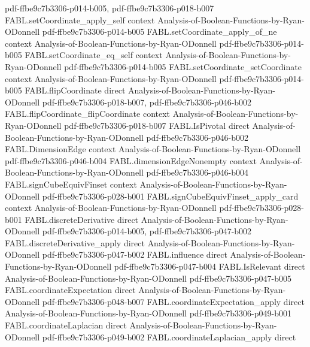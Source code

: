 \begin{theorem}
  {pdf-ffbe9c7b3306-p014-b005,
    pdf-ffbe9c7b3306-p018-b007}
\proofstep
  {FABL.setCoordinate_apply_self}
  {context}
  {Analysis-of-Boolean-Functions-by-Ryan-ODonnell}
  {pdf-ffbe9c7b3306-p014-b005}
\proofstep
  {FABL.setCoordinate_apply_of_ne}
  {context}
  {Analysis-of-Boolean-Functions-by-Ryan-ODonnell}
  {pdf-ffbe9c7b3306-p014-b005}
\proofstep
  {FABL.setCoordinate_eq_self}
  {context}
  {Analysis-of-Boolean-Functions-by-Ryan-ODonnell}
  {pdf-ffbe9c7b3306-p014-b005}
\proofstep
  {FABL.setCoordinate_setCoordinate}
  {context}
  {Analysis-of-Boolean-Functions-by-Ryan-ODonnell}
  {pdf-ffbe9c7b3306-p014-b005}
\proofstep
  {FABL.flipCoordinate}
  {direct}
  {Analysis-of-Boolean-Functions-by-Ryan-ODonnell}
  {pdf-ffbe9c7b3306-p018-b007,
    pdf-ffbe9c7b3306-p046-b002}
\proofstep
  {FABL.flipCoordinate_flipCoordinate}
  {context}
  {Analysis-of-Boolean-Functions-by-Ryan-ODonnell}
  {pdf-ffbe9c7b3306-p018-b007}
\proofstep
  {FABL.IsPivotal}
  {direct}
  {Analysis-of-Boolean-Functions-by-Ryan-ODonnell}
  {pdf-ffbe9c7b3306-p046-b002}
\proofstep
  {FABL.DimensionEdge}
  {context}
  {Analysis-of-Boolean-Functions-by-Ryan-ODonnell}
  {pdf-ffbe9c7b3306-p046-b004}
\proofstep
  {FABL.dimensionEdgeNonempty}
  {context}
  {Analysis-of-Boolean-Functions-by-Ryan-ODonnell}
  {pdf-ffbe9c7b3306-p046-b004}
\proofstep
  {FABL.signCubeEquivFinset}
  {context}
  {Analysis-of-Boolean-Functions-by-Ryan-ODonnell}
  {pdf-ffbe9c7b3306-p028-b001}
\proofstep
  {FABL.signCubeEquivFinset_apply_card}
  {context}
  {Analysis-of-Boolean-Functions-by-Ryan-ODonnell}
  {pdf-ffbe9c7b3306-p028-b001}
\proofstep
  {FABL.discreteDerivative}
  {direct}
  {Analysis-of-Boolean-Functions-by-Ryan-ODonnell}
  {pdf-ffbe9c7b3306-p014-b005,
    pdf-ffbe9c7b3306-p047-b002}
\proofstep
  {FABL.discreteDerivative_apply}
  {direct}
  {Analysis-of-Boolean-Functions-by-Ryan-ODonnell}
  {pdf-ffbe9c7b3306-p047-b002}
\proofstep
  {FABL.influence}
  {direct}
  {Analysis-of-Boolean-Functions-by-Ryan-ODonnell}
  {pdf-ffbe9c7b3306-p047-b004}
\proofstep
  {FABL.IsRelevant}
  {direct}
  {Analysis-of-Boolean-Functions-by-Ryan-ODonnell}
  {pdf-ffbe9c7b3306-p047-b005}
\proofstep
  {FABL.coordinateExpectation}
  {direct}
  {Analysis-of-Boolean-Functions-by-Ryan-ODonnell}
  {pdf-ffbe9c7b3306-p048-b007}
\proofstep
  {FABL.coordinateExpectation_apply}
  {direct}
  {Analysis-of-Boolean-Functions-by-Ryan-ODonnell}
  {pdf-ffbe9c7b3306-p049-b001}
\proofstep
  {FABL.coordinateLaplacian}
  {direct}
  {Analysis-of-Boolean-Functions-by-Ryan-ODonnell}
  {pdf-ffbe9c7b3306-p049-b002}
\proofstep
  {FABL.coordinateLaplacian_apply}
  {direct}

\end{theorem}

